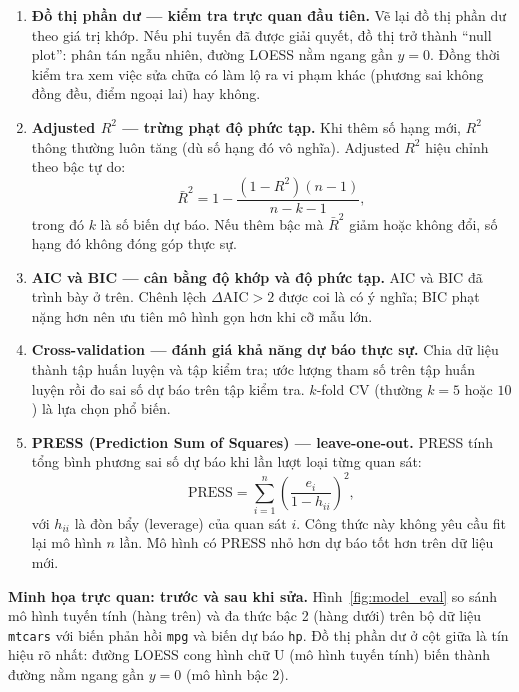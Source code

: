 \documentclass[12pt, a4paper]{article}
\begin{document}
\begin{enumerate}

  \item \textbf{Đồ thị phần dư — kiểm tra trực quan đầu tiên.}
  Vẽ lại đồ thị phần dư theo giá trị khớp. Nếu phi tuyến đã được giải quyết, đồ thị trở thành ``null plot'': phân tán ngẫu nhiên, đường LOESS nằm ngang gần $y=0$. Đồng thời kiểm tra xem việc sửa chữa có làm lộ ra vi phạm khác (phương sai không đồng đều, điểm ngoại lai) hay không.

  \item \textbf{Adjusted $R^2$ — trừng phạt độ phức tạp.}
  Khi thêm số hạng mới, $R^2$ thông thường luôn tăng (dù số hạng đó vô nghĩa). Adjusted $R^2$ hiệu chỉnh theo bậc tự do:
  \[
    \bar{R}^2 = 1 - \frac{(1-R^2)(n-1)}{n-k-1},
  \]
  trong đó $k$ là số biến dự báo. Nếu thêm bậc mà $\bar{R}^2$ giảm hoặc không đổi, số hạng đó không đóng góp thực sự.

  \item \textbf{AIC và BIC — cân bằng độ khớp và độ phức tạp.}
  AIC và BIC đã trình bày ở trên. Chênh lệch $\Delta\text{AIC} > 2$ được coi là có ý nghĩa; BIC phạt nặng hơn nên ưu tiên mô hình gọn hơn khi cỡ mẫu lớn.

  \item \textbf{Cross-validation — đánh giá khả năng dự báo thực sự.}
  Chia dữ liệu thành tập huấn luyện và tập kiểm tra; ước lượng tham số trên tập huấn luyện rồi đo sai số dự báo trên tập kiểm tra. $k$-fold CV (thường $k=5$ hoặc $10$) là lựa chọn phổ biến.

  \item \textbf{PRESS (Prediction Sum of Squares) — leave-one-out.}
  PRESS tính tổng bình phương sai số dự báo khi lần lượt loại từng quan sát:
  \[
    \text{PRESS} = \sum_{i=1}^n \left(\frac{e_i}{1 - h_{ii}}\right)^2,
  \]
  với $h_{ii}$ là đòn bẩy (leverage) của quan sát $i$. Công thức này không yêu cầu fit lại mô hình $n$ lần. Mô hình có PRESS nhỏ hơn dự báo tốt hơn trên dữ liệu mới.

\end{enumerate}

\medskip
\noindent\textbf{Minh họa trực quan: trước và sau khi sửa.}
Hình~\ref{fig:model_eval} so sánh mô hình tuyến tính (hàng trên) và đa thức bậc 2 (hàng dưới) trên bộ dữ liệu \texttt{mtcars} với biến phản hồi \texttt{mpg} và biến dự báo \texttt{hp}. Đồ thị phần dư ở cột giữa là tín hiệu rõ nhất: đường LOESS cong hình chữ U (mô hình tuyến tính) biến thành đường nằm ngang gần $y=0$ (mô hình bậc 2).
\end{document}
